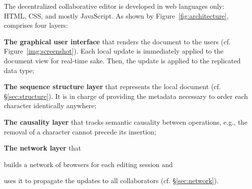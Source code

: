The decentralized collaborative editor \CRATE is developed in web languages
only: HTML, CSS, and mostly JavaScript. As shown by
Figure~\ref{fig:architecture}, \CRATE comprises four layers:
\begin{asparadesc}
\item [\textbf{The graphical user interface}] that renders the document to the users
  (cf. Figure~\ref{img:screenshot}). Each local update is immediately applied to
  the document view for real-time sake. Then, the update is applied to the
  replicated data type;
\item [\textbf{The sequence structure layer}] that represents the local document
  (cf. §\ref{sec:structure}). It is in charge of providing the metadata
  necessary to order each character identically anywhere;
\item [\textbf{The causality layer}] that tracks semantic causality between operations,
  e.g., the removal of a character cannot precede its insertion;
\item [\textbf{The network layer}] that
  \begin{inparaenum}[(i)]
  \item builds a network of browsers for each editing session and
  \item uses it to propagate the updates to all collaborators
    (cf. §\ref{sec:network}).
  \end{inparaenum}
\end{asparadesc}

